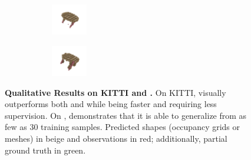 \begin{figure}[t]
{\begin{subfigure}[t]{0.5\textwidth}
\begin{subfigure}[t]{0.15\textwidth}
			\includegraphics[width=1.55cm,trim={\cropleft cm \croplower cm \cropright cm \cropupper cm},clip]{gexp_clean_rtable_low_10_wide_vae_aml_3_3_res_6}
		\end{subfigure}
		\begin{subfigure}[t]{0.15\textwidth}
			\vspace{0px}\centering
			\includegraphics[width=1.55cm,trim={\cropleft cm \croplower cm \cropright cm \cropupper cm},clip]{gexp_clean_rtable_low_10_wide_vae_aml_3_3_res_8}
		\end{subfigure}
	\end{subfigure}
    }
    \vspace*{-\figskipcaption px}
	\caption{{\bf Qualitative Results on KITTI and \Kinect.} On KITTI, \AML visually outperforms both \Dai and \Engelmann while being faster and requiring less supervision. On \Kinect, \AML demonstrates that it is able to generalize from as few as $30$ training samples. Predicted shapes (occupancy grids or meshes) in {\color{rbeige}beige} and observations in {\color{rred}red}; additionally, partial ground truth in {\color{rgreen}green}.}
	\label{fig:results-real}
    \vspace*{-\figskipbelow px}
\end{figure}